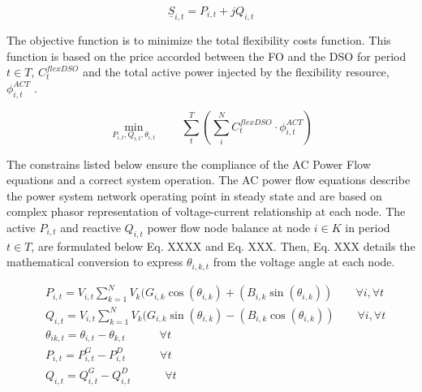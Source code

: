 \begin{equation}
\underline{S}_{i,t} = P_{i,t} + jQ_{i,t}
\end{equation}


The objective function is to minimize the total flexibility costs function. This function is based on the price accorded between the FO and the DSO for period $t \in T$, $C_{t}^{flexDSO}$ and the total active power injected by the flexibility resource, $\phi_{i,t}^{ACT}$ .

\begin{equation*}
\!\min_{P_{i,t}, Q_{i,t}, \theta_{i,t}}  \qquad \sum_{t}^{T} \left( \sum_{i}^{N} C_t^{flexDSO} \cdot \phi_{i,t}^{ACT} \right)  
\end{equation*}

The constrains listed below ensure the compliance of the AC Power Flow equations and a correct system operation.
The AC power flow equations describe the power system network operating point in steady state and are based on complex phasor representation of voltage-current relationship at each node. The active $P_{i,t}$ and reactive $Q_{i,t}$ power flow node balance at node $i \in K$ in period  $t \in T$, are formulated below Eq. XXXX and Eq. XXX. Then, Eq. XXX details the mathematical conversion to express  $\theta_{i,k,t}$ from the voltage angle at each node.

\begin{subequations}
\begin{align*}
& P_{i,t} = V_{i,t} \sum_{k=1}^{N} V_{k} (G_{i,k} \cos(\theta_{i,k}) + (B_{i,k} \sin(\theta_{i,k})) \qquad \forall i,\forall t  \\ 
& Q_{i,t} = V_{i,t} \sum_{k=1}^{N} V_{k} (G_{i,k} \sin(\theta_{i,k}) - (B_{i,k} \cos(\theta_{i,k})) \qquad \forall i,\forall t \\
& \theta_{ik,t} = \theta_{i,t} - \theta_{k,t} \quad   \qquad  \forall t \\
& P_{i,t} = P_{i,t}^{G} - P_{i,t}^{D}  \quad   \qquad  \forall t  \\
& Q_{i,t} = Q_{i,t}^{G} - Q_{i,t}^{D}  \quad   \qquad  \forall t  
\end{align*}
\end{subequations}


